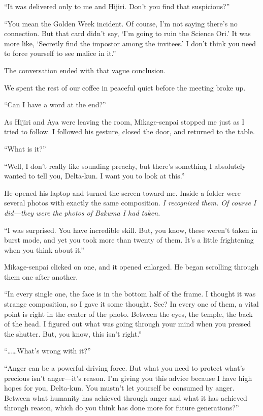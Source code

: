 \documentclass[
    a4paper,
    12pt,
    twoside,
    openany,
    UTF8,
    fontset=windows
]{ctexbook}
\begin{document}
``It was delivered only to me and Hijiri. Don't you find that suspicious?''

``You mean the Golden Week incident. Of course, I'm not saying there's no connection. But that card didn't say, `I'm going to ruin the Science Ori.' It was more like, `Secretly find the impostor among the invitees.' I don't think you need to force yourself to see malice in it.''

The conversation ended with that vague conclusion.

We spent the rest of our coffee in peaceful quiet before the meeting broke up.

``Can I have a word at the end?''

As Hijiri and Aya were leaving the room, Mikage-senpai stopped me just as I tried to follow. I followed his gesture, closed the door, and returned to the table.

``What is it?''

``Well, I don't really like sounding preachy, but there's something I absolutely wanted to tell you, Delta-kun. I want you to look at this.''

He opened his laptop and turned the screen toward me. Inside a folder were several photos with exactly the same composition. \textit{I recognized them. Of course I did---they were the photos of Bakuma I had taken.}

``I was surprised. You have incredible skill. But, you know, these weren't taken in burst mode, and yet you took more than twenty of them. It's a little frightening when you think about it.''

Mikage-senpai clicked on one, and it opened enlarged. He began scrolling through them one after another.

``In every single one, the face is in the bottom half of the frame. I thought it was strange composition, so I gave it some thought. See? In every one of them, a vital point is right in the center of the photo. Between the eyes, the temple, the back of the head. I figured out what was going through your mind when you pressed the shutter. But, you know, this isn't right.''

``\dots\dots What's wrong with it?''

``Anger can be a powerful driving force. But what you need to protect what's precious isn't anger---it's reason. I'm giving you this advice because I have high hopes for you, Delta-kun. You mustn't let yourself be consumed by anger. Between what humanity has achieved through anger and what it has achieved through reason, which do you think has done more for future generations?''
\end{document}
